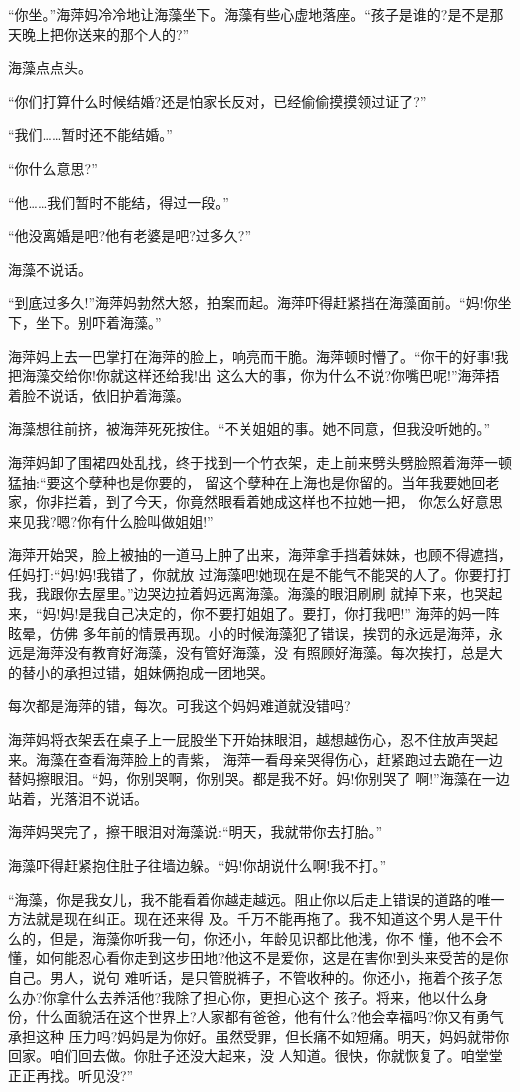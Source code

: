 \documentclass[11pt,a4paper,onecolumn]{article}
\begin{document}
``你坐。''海萍妈冷冷地让海藻坐下。海藻有些心虚地落座。``孩子是谁的?是不是那天晚上把你送来的那个人的?''

海藻点点头。

``你们打算什么时候结婚?还是怕家长反对，已经偷偷摸摸领过证了?''

``我们……暂时还不能结婚。''

``你什么意思?''

``他……我们暂时不能结，得过一段。''

``他没离婚是吧?他有老婆是吧?过多久?''

海藻不说话。

``到底过多久!''海萍妈勃然大怒，拍案而起。海萍吓得赶紧挡在海藻面前。``妈!你坐下，坐下。别吓着海藻。''

海萍妈上去一巴掌打在海萍的脸上，响亮而干脆。海萍顿时懵了。``你干的好事!我把海藻交给你!你就这样还给我!出
这么大的事，你为什么不说?你嘴巴呢!''海萍捂着脸不说话，依旧护着海藻。

海藻想往前挤，被海萍死死按住。``不关姐姐的事。她不同意，但我没听她的。''

海萍妈卸了围裙四处乱找，终于找到一个竹衣架，走上前来劈头劈脸照着海萍一顿猛抽:``要这个孽种也是你要的，
留这个孽种在上海也是你留的。当年我要她回老家，你非拦着，到了今天，你竟然眼看着她成这样也不拉她一把，
你怎么好意思来见我?嗯?你有什么脸叫做姐姐!''

海萍开始哭，脸上被抽的一道马上肿了出来，海萍拿手挡着妹妹，也顾不得遮挡，任妈打:``妈!妈!我错了，你就放
过海藻吧!她现在是不能气不能哭的人了。你要打打我，我跟你去屋里。''边哭边拉着妈远离海藻。海藻的眼泪刷刷
就掉下来，也哭起来，``妈!妈!是我自己决定的，你不要打姐姐了。要打，你打我吧!'' 海萍的妈一阵眩晕，仿佛
多年前的情景再现。小的时候海藻犯了错误，挨罚的永远是海萍，永远是海萍没有教育好海藻，没有管好海藻，没
有照顾好海藻。每次挨打，总是大的替小的承担过错，姐妹俩抱成一团地哭。

每次都是海萍的错，每次。可我这个妈妈难道就没错吗?

海萍妈将衣架丢在桌子上一屁股坐下开始抹眼泪，越想越伤心，忍不住放声哭起来。海藻在查看海萍脸上的青紫，
海萍一看母亲哭得伤心，赶紧跑过去跪在一边替妈擦眼泪。``妈，你别哭啊，你别哭。都是我不好。妈!你别哭了
啊!''海藻在一边站着，光落泪不说话。

海萍妈哭完了，擦干眼泪对海藻说:``明天，我就带你去打胎。''

海藻吓得赶紧抱住肚子往墙边躲。``妈!你胡说什么啊!我不打。''

``海藻，你是我女儿，我不能看着你越走越远。阻止你以后走上错误的道路的唯一方法就是现在纠正。现在还来得
及。千万不能再拖了。我不知道这个男人是干什么的，但是，海藻你听我一句，你还小，年龄见识都比他浅，你不
懂，他不会不懂，如何能忍心看你走到这步田地?他这不是爱你，这是在害你!到头来受苦的是你自己。男人，说句
难听话，是只管脱裤子，不管收种的。你还小，拖着个孩子怎么办?你拿什么去养活他?我除了担心你，更担心这个
孩子。将来，他以什么身份，什么面貌活在这个世界上?人家都有爸爸，他有什么?他会幸福吗?你又有勇气承担这种
压力吗?妈妈是为你好。虽然受罪，但长痛不如短痛。明天，妈妈就带你回家。咱们回去做。你肚子还没大起来，没
人知道。很快，你就恢复了。咱堂堂正正再找。听见没?''
\end{document}
